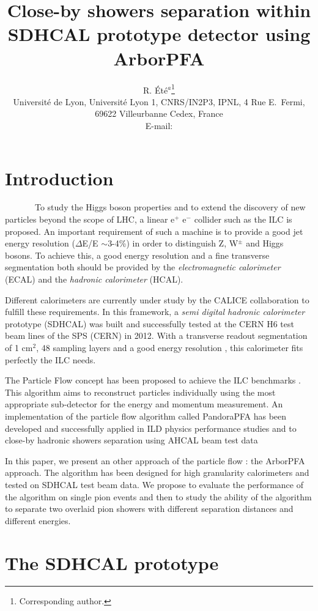 \documentclass[cits]{JINST}
\title{Close-by showers separation within SDHCAL prototype detector using ArborPFA}
\author{R. \'Et\'e$^a$\thanks{Corresponding author.} \\%
\llap{$^a$} Universit\'e de Lyon, Universit\'e Lyon 1, CNRS/IN2P3, 
 IPNL, 4 Rue E.~Fermi, 69622 Villeurbanne Cedex, France\\
 
 
 E-mail: \email{rete@ipnl.in2p3.fr}
 }
\begin{document}

\newpage
\section{Introduction}

~~~~~~~To study the Higgs boson properties and to extend the discovery of new particles beyond the scope of LHC, a linear e$^+$ e$^-$ collider such as the ILC is proposed. An important requirement of such a machine is to provide a good jet energy resolution ($\Delta$E/E $\sim$3-4\%) in order to distinguish Z, W$^{\pm}$ and Higgs bosons. To achieve this, a good energy resolution and a fine transverse segmentation both should be provided by the \textit{electromagnetic calorimeter} (ECAL) and the \textit{hadronic calorimeter} (HCAL).

Different calorimeters are currently under study by the CALICE collaboration to fulfill these requirements. In this framework, a \textit{semi digital hadronic calorimeter} prototype (SDHCAL) was built \cite{sdhcal-paper} and successfully tested at the CERN H6 test beam lines of the SPS (CERN) in 2012. With a transverse readout segmentation of 1 cm$^2$, 48 sampling layers and a good energy resolution \cite{sdhcal-paper}, this calorimeter fits perfectly the ILC needs. 


The Particle Flow concept has been proposed to achieve the ILC benchmarks \cite{ilc-tdr}. This algorithm aims to reconstruct particles individually using the most appropriate sub-detector for the energy and momentum measurement. An implementation of the particle flow algorithm called PandoraPFA has been developed \cite{pandora-pfa} and successfully applied in ILD physics performance studies and to close-by hadronic showers separation using AHCAL beam test data %

In this paper, we present an other approach of the particle flow : the ArborPFA approach. The algorithm has been designed for high granularity calorimeters and tested on SDHCAL test beam data. We propose to evaluate the performance of the algorithm on single pion events and then to study the ability of the algorithm to separate two overlaid pion showers with different separation distances and different energies.

\newpage
\section{The SDHCAL prototype}
\end{document}
